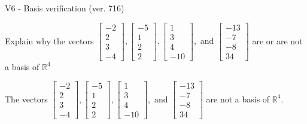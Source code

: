 \begin{exercise}
  \begin{exerciseTitle}V6 - Basis verification (ver. 716)\end{exerciseTitle}
  \begin{exerciseStatement}
    Explain why the vectors \(\left[\begin{array}{r}
-2 \\
2 \\
3 \\
-4
\end{array}\right] , \left[\begin{array}{r}
-5 \\
1 \\
2 \\
2
\end{array}\right] , \left[\begin{array}{r}
1 \\
3 \\
4 \\
-10
\end{array}\right] , \text{ and } \left[\begin{array}{r}
-13 \\
-7 \\
-8 \\
34
\end{array}\right]\) are or are not a basis of \(\mathbb{R}^4\)	


  \end{exerciseStatement}
  \begin{exerciseAnswer}
   The vectors \(\left[\begin{array}{r}
-2 \\
2 \\
3 \\
-4
\end{array}\right] , \left[\begin{array}{r}
-5 \\
1 \\
2 \\
2
\end{array}\right] , \left[\begin{array}{r}
1 \\
3 \\
4 \\
-10
\end{array}\right] , \text{ and } \left[\begin{array}{r}
-13 \\
-7 \\
-8 \\
34
\end{array}\right]\) 
  	 are not  a basis of \(\mathbb{R}^4\).
  


  \end{exerciseAnswer}
\end{exercise}